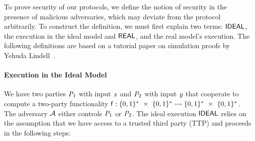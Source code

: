 To prove security of our protocols, we define the notion of security in the presence of malicious adversaries, which may deviate from the protocol arbitrarily.
To construct the definition, we must first explain two terms: $\mathsf{IDEAL}$, the execution in the ideal model and $\mathsf{REAL}$, and the real model's execution.
The following definitions are based on a tutorial paper on simulation proofs by Yehuda Lindell~\cite{lindell2017simulate}.

\paragraph{Execution in the Ideal Model} We have two parties $\mathit{P}_{1}$ with input $\mathit{x}$ and $\mathit{P}_{2}$ with input $\mathit{y}$ that cooperate to compute a two-party functionality $\mathsf{f} : \{0,1\}^{*} ~\times~ \{0,1\}^{*} \rightarrowtail \{0,1\}^{*} ~\times~ \{0,1\}^{*}$.
The adversary $\mathcal{A}$ either controls $\mathit{P}_{1}$ or $\mathit{P}_{2}$.
The ideal execution $\mathsf{IDEAL}$ relies on the assumption that we have access to a trusted third party (TTP) and proceeds in the following steps:

